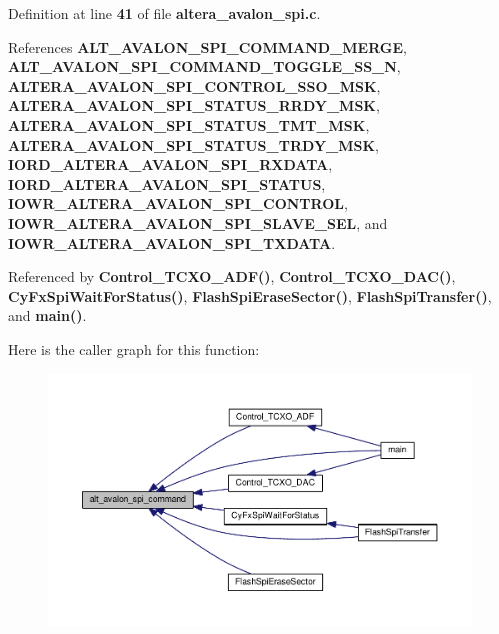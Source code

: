 Definition at line {\bf 41} of file {\bf altera\+\_\+avalon\+\_\+spi.\+c}.



References {\bf A\+L\+T\+\_\+\+A\+V\+A\+L\+O\+N\+\_\+\+S\+P\+I\+\_\+\+C\+O\+M\+M\+A\+N\+D\+\_\+\+M\+E\+R\+GE}, {\bf A\+L\+T\+\_\+\+A\+V\+A\+L\+O\+N\+\_\+\+S\+P\+I\+\_\+\+C\+O\+M\+M\+A\+N\+D\+\_\+\+T\+O\+G\+G\+L\+E\+\_\+\+S\+S\+\_\+N}, {\bf A\+L\+T\+E\+R\+A\+\_\+\+A\+V\+A\+L\+O\+N\+\_\+\+S\+P\+I\+\_\+\+C\+O\+N\+T\+R\+O\+L\+\_\+\+S\+S\+O\+\_\+\+M\+SK}, {\bf A\+L\+T\+E\+R\+A\+\_\+\+A\+V\+A\+L\+O\+N\+\_\+\+S\+P\+I\+\_\+\+S\+T\+A\+T\+U\+S\+\_\+\+R\+R\+D\+Y\+\_\+\+M\+SK}, {\bf A\+L\+T\+E\+R\+A\+\_\+\+A\+V\+A\+L\+O\+N\+\_\+\+S\+P\+I\+\_\+\+S\+T\+A\+T\+U\+S\+\_\+\+T\+M\+T\+\_\+\+M\+SK}, {\bf A\+L\+T\+E\+R\+A\+\_\+\+A\+V\+A\+L\+O\+N\+\_\+\+S\+P\+I\+\_\+\+S\+T\+A\+T\+U\+S\+\_\+\+T\+R\+D\+Y\+\_\+\+M\+SK}, {\bf I\+O\+R\+D\+\_\+\+A\+L\+T\+E\+R\+A\+\_\+\+A\+V\+A\+L\+O\+N\+\_\+\+S\+P\+I\+\_\+\+R\+X\+D\+A\+TA}, {\bf I\+O\+R\+D\+\_\+\+A\+L\+T\+E\+R\+A\+\_\+\+A\+V\+A\+L\+O\+N\+\_\+\+S\+P\+I\+\_\+\+S\+T\+A\+T\+US}, {\bf I\+O\+W\+R\+\_\+\+A\+L\+T\+E\+R\+A\+\_\+\+A\+V\+A\+L\+O\+N\+\_\+\+S\+P\+I\+\_\+\+C\+O\+N\+T\+R\+OL}, {\bf I\+O\+W\+R\+\_\+\+A\+L\+T\+E\+R\+A\+\_\+\+A\+V\+A\+L\+O\+N\+\_\+\+S\+P\+I\+\_\+\+S\+L\+A\+V\+E\+\_\+\+S\+EL}, and {\bf I\+O\+W\+R\+\_\+\+A\+L\+T\+E\+R\+A\+\_\+\+A\+V\+A\+L\+O\+N\+\_\+\+S\+P\+I\+\_\+\+T\+X\+D\+A\+TA}.



Referenced by {\bf Control\+\_\+\+T\+C\+X\+O\+\_\+\+A\+D\+F()}, {\bf Control\+\_\+\+T\+C\+X\+O\+\_\+\+D\+A\+C()}, {\bf Cy\+Fx\+Spi\+Wait\+For\+Status()}, {\bf Flash\+Spi\+Erase\+Sector()}, {\bf Flash\+Spi\+Transfer()}, and {\bf main()}.



Here is the caller graph for this function\+:
\nopagebreak
\begin{figure}[H]
\begin{center}
\leavevmode
\includegraphics[width=350pt]{d2/dcc/altera__avalon__spi_8h_aa51d00139d8c14135648e727d150936d_icgraph}
\end{center}
\end{figure}


